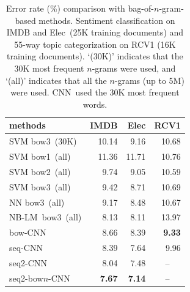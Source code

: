 \documentclass[11pt,letterpaper]{article}
\newcommand{\cnn}{CNN}
\newcommand{\scnn}{seq-CNN}
\newcommand{\sscnn}{seq2-CNN}
\newcommand{\ssbcnn}{seq2-bow$n$-CNN}
\newcommand{\bcnn}{bow-CNN}
\newcommand{\bowone}{{bow1}}
\newcommand{\bowtwo}{{bow2}}
\newcommand{\bowthree}{{bow3}}
\newcommand{\Elec}{Elec}
\newcommand{\nbw}{NB-LM}
\begin{document}
\begin{table}
\begin{center}
\begin{small}
\begin{tabular}{|l|r|r|r|} 
\hline
methods        & IMDB  & Elec  &  RCV1 \\  %
\hline
SVM \bowthree\ (30K)& 10.14 &  9.16 & 10.68 \\ %
\hline
SVM \bowone\ (all)  &    11.36 &    11.71 &     10.76 \\ 
SVM \bowtwo\ (all)  &     9.74 &     9.05 &     10.59 \\ 
SVM \bowthree\ (all)&     9.42 &     8.71 &     10.69 \\
\hline
NN \bowthree\ (all) &     9.17 &     8.48 &     10.67 \\ %
\hline
\nbw\ \bowthree\ (all)&     8.13 &     8.11 &     13.97 \\ %
\hline \hline
\bcnn\      &     8.66 &     8.39 &{\bf 9.33}\\ 
\scnn\      &     8.39 &     7.64 &     9.96 \\ 
\hline
\sscnn\     &     8.04 &     7.48 &\multicolumn{1}{|c|}{--}\\
\ssbcnn\    &{\bf 7.67}&{\bf 7.14}&\multicolumn{1}{|c|}{--}\\
\hline
\end{tabular}
\end{small}
\vspace{-0.1in}
\caption{ \label{tab:all} \small
Error rate (\%) 
comparison with bag-of-$n$-gram-based methods.
Sentiment classification on IMDB and \Elec\
(25K training documents) 
and 55-way topic categorization on RCV1 (16K training documents).  
`(30K)' indicates that the 30K most frequent $n$-grams were used, 
and `(all)' indicates that all the $n$-grams (up to 5M) were used.  
\cnn\ used the 30K most frequent words.  
}
\end{center}
\end{table}
\end{document}
